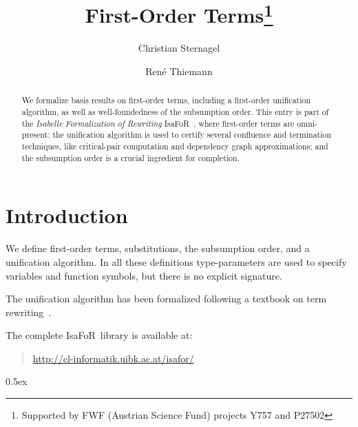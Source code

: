 \documentclass[11pt,a4paper]{article}
\newcommand\isafor{\textsf{IsaFoR}}
\begin{document}
\title{First-Order Terms\footnote{Supported by FWF (Austrian Science Fund) projects Y757 and P27502}}
\author{Christian Sternagel \and Ren\'e Thiemann}
\maketitle


\begin{abstract}
We formalize basis results on first-order terms, including a first-order unification algorithm,
as well as well-foundedness of the subsumption order. 
This entry is part of the \emph{Isabelle Formalization of Rewriting} \isafor~\cite{isafor},
where first-order terms are omni-present: the unification algorithm 
is used to certify several confluence and termination techniques, like
critical-pair computation and dependency graph approximations; and the subsumption order
is a crucial ingredient for completion.
\end{abstract}

\tableofcontents

\section{Introduction}

We define first-order terms, substitutions, the subsumption order, and a unification algorithm.
In all these definitions type-parameters are used to specify variables
and function symbols, but there is no explicit signature. 

The unification algorithm has been formalized following a textbook on term rewriting~\cite{AllThat}.

The complete \isafor\ library is available at:
\begin{quote}
\url{http://cl-informatik.uibk.ac.at/isafor/}
\end{quote}

\parindent 0pt\parskip 0.5ex





\end{document}
